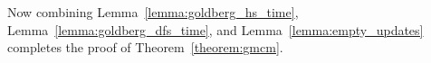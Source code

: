 \documentclass[a4paper,UKenglish]{socg-lipics-v2018}
\makeatletter
\def\note#1{\textcolor{red}{{#1}}}
\def\polylog{\mathop{\mathrm{polylog}}}
\def\eps{\varepsilon}
\def\fsupply{\phi}
\theoremstyle{plain}
\numberwithin{figure}{section}
\def\EMPH#1{\textbf{\emph{\boldmath #1}}}
\def\n@te#1{\textsf{\boldmath \textbf{$\langle\!\langle$#1$\rangle\!\rangle$}}\leavevmode}
\def\note#1{\textcolor{red}{\n@te{#1}}}
\makeatother
\begin{document}
%
Now combining Lemma~\ref{lemma:goldberg_hs_time}, Lemma~\ref{lemma:goldberg_dfs_time}, and
Lemma~\ref{lemma:empty_updates}
completes the proof of Theorem~\ref{theorem:gmcm}.



%

%
%
%
\end{document}
